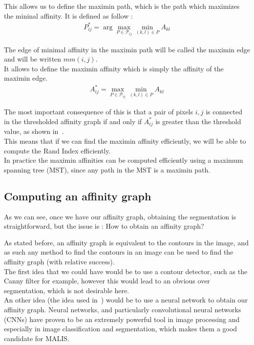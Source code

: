 This allows us to define the maximin path, which is the path which maximizes the
mininal affinity. It is defined as follow :
\begin{gather*}
	P^*_{ij} =\arg \max_{P\in\mathcal{P}_{ij}}\min_{(k,l)\in P} A_{kl}
\end{gather*}

The edge of minimal affinity in the maximin path will be called the maximin
edge and will be written $mm(i,j)$.\\
It allows to define the maximin affinity which is simply the affinity of the
maximin edge.
\begin{gather*}
	A^*_{ij} = \max_{P\in\mathcal{P}_{ij}}\min_{(k,l)\in P} A_{kl}
\end{gather*}

The most important consequence of this is that a pair of pixels $i,j$ is connected in
the thresholded affinity graph if and only if $A^*_{ij}$ is greater than the threshold
value, as shown in~\cite{turaga_maximin_2009}.\\

This means that if we can find the maximin affinity efficiently, we will be
able to compute the Rand Index efficiently.\\
In practice the maximin affinities can be computed efficiently using a maximum
spanning tree (MST), since any path in the MST is a maximin path.

\subsection{Computing an affinity graph}
As we can see, once we have our affinity graph, obtaining the segmentation is
straightforward, but the issue is : How to obtain an affinity graph? 

As stated before, an affinity graph is equivalent to the contours in the image,
and as such any method to find the contours in an image can be used to find the
affinity graph (with relative success).\\
The first idea that we could have would be to use a contour detector, such as
the Canny filter for example, however this would lead to an obvious over
segmentation, which is not desirable here.\\

An other idea (the idea used in~\cite{turaga_maximin_2009}) would be to use a
neural network to obtain our affinity graph. Neural networks, and particularly
convolutional neural networks (CNNs) have proven to be an extremely powerful
tool in image processing and especially in image classification and
segmentation, which makes them a good candidate for MALIS.\\

